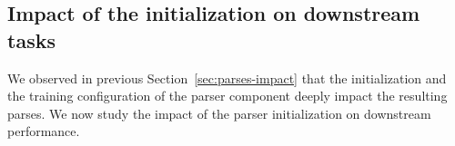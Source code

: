 
\subsection{Impact of the initialization on downstream tasks} %
\label{sec:dowstream-impact}

We observed in previous Section~\ref{sec:parses-impact} that the initialization and the training configuration of the parser component deeply impact the resulting parses. We now study the impact of the parser initialization on downstream performance.


